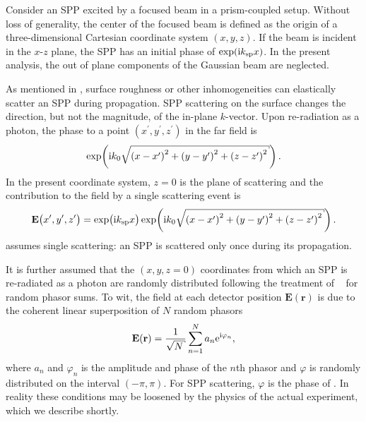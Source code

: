 Consider an SPP excited by a focused beam in a prism-coupled setup.  Without
loss of generality, the center of the focused beam is defined as the origin
of a three-dimensional Cartesian coordinate system $(x,y,z)$.  If the beam is
incident in the $x$-$z$ plane, the SPP has an initial phase of $\exp({\mathrm{i}} k_\mathrm{sp}
x)$.  In the present analysis, the out of plane components of the Gaussian
beam are neglected.

As mentioned in , surface roughness or other
inhomogeneities can elastically scatter an SPP during propagation.  SPP
scattering on the surface changes the direction, but not the magnitude, of the
in-plane $k$-vector.  Upon re-radiation as a photon, the phase to a point
$(x^\prime,y^\prime,z^\prime)$ in the far field is 
\begin{equation}
\exp\!\left(\mi k_0 \sqrt{{(x-x^\prime)}^2 + {(y-y^\prime)}^2 + {(z-z^\prime)}^2}\right).
\end{equation}
In the present coordinate system, $z=0$ is the plane of scattering and the
contribution to the field by a single scattering event is
\begin{equation}
\mathbf{E}\big(x^\prime,y^\prime,z^\prime\big)=\exp\!\big( \mi \ksp x \big)
\exp\!\left(\mi k_0 \sqrt{{(x-x^\prime)}^2 + {(y-y^\prime)}^2 + {(z-z^\prime)}^2}\right).
\label{eqn:sppsinglescattering}
\end{equation}
 assumes single scattering: an
SPP is scattered only once during its propagation.

It is further assumed that the $(x,y,z=0)$ coordinates from which an SPP is
re-radiated as a photon are randomly distributed following the treatment of
~\cite{goodman2007speckle} for random phasor sums.  To wit, the
field at each detector position $\mathbf{E}(\mathbf{r})$ is due to the
coherent linear superposition of $N$ random phasors
\begin{equation}
\mathbf{E}(\mathbf{r}) = \frac{1}{\sqrt{N}} \sum_{n=1}^{N} a_n \me^{\mi \varphi_n},
\label{eqn:phasorsum}
\end{equation}
where $a_n$ and $\varphi_n$ is the amplitude and phase of the $n$th phasor 
and $\varphi$ is randomly distributed on the interval $(-\pi,\pi)$.  For 
SPP scattering, $\varphi$ is the phase of .
In reality these conditions may be loosened by the physics of the actual
experiment, which we describe shortly.

